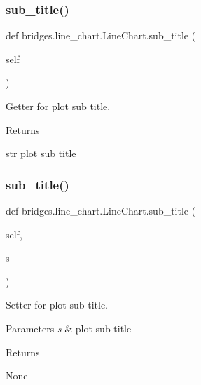 \subsubsection{\texorpdfstring{sub\+\_\+title()}{sub\_title()}\hspace{0.1cm}{\footnotesize\ttfamily [1/2]}}
{\footnotesize\ttfamily def bridges.\+line\+\_\+chart.\+Line\+Chart.\+sub\+\_\+title (\begin{DoxyParamCaption}\item[{}]{self }\end{DoxyParamCaption})}



Getter for plot sub title. 

\begin{DoxyReturn}{Returns}


str plot sub title 
\end{DoxyReturn}
\mbox{\label{classbridges_1_1line__chart_1_1_line_chart_ac26e0a4de0438a5463ba5dca95d2b0a3}} 
\subsubsection{\texorpdfstring{sub\+\_\+title()}{sub\_title()}\hspace{0.1cm}{\footnotesize\ttfamily [2/2]}}
{\footnotesize\ttfamily def bridges.\+line\+\_\+chart.\+Line\+Chart.\+sub\+\_\+title (\begin{DoxyParamCaption}\item[{}]{self,  }\item[{}]{s }\end{DoxyParamCaption})}



Setter for plot sub title. 


\begin{DoxyParams}{Parameters}
{\em s} & plot sub title \\
\hline
\end{DoxyParams}
\begin{DoxyReturn}{Returns}


None 
\end{DoxyReturn}
\mbox{\label{classbridges_1_1line__chart_1_1_line_chart_ae9a4a1643095d0d0ac4d98e15adbeb3f}} 
